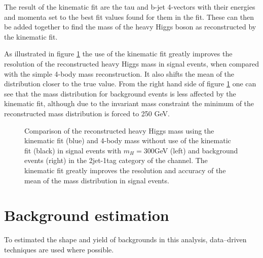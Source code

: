 The result of the kinematic fit are the tau and b-jet 4-vectors with their energies and momenta
set to the best fit values found for them in the fit. These can then be added together to find
the mass of the heavy Higgs boson as reconstructed by the kinematic fit.

As illustrated in figure \ref{fig:kinfitvsmjj} the use of the kinematic fit greatly
improves the resolution of the reconstructed heavy Higgs mass in signal events, when 
compared with the simple 4-body mass reconstruction. It also shifts the mean of the
distribution closer to the true value. From the right hand side of
figure \ref{fig:kinfitvsmjj} one can see that the mass distribution for
background events is less affected by the kinematic fit, although due to the
invariant mass constraint the minimum of the reconstructed mass distribution
is forced to 250 GeV.

\begin{figure}[h!]
\begin{center}
\end{center}
\caption{Comparison of the reconstructed heavy Higgs mass using the kinematic fit (blue) and
4-body mass without use of the kinematic fit (black) in signal events with $m_{H} = 300 $GeV (left) and \ttbar background events (right) in 
the 2jet-1tag category of the \mutau channel. The kinematic fit greatly improves the resolution and 
accuracy of the mean of the mass distribution in signal events. \cite{HIG-14-034-additional}}%
\label{fig:kinfitvsmjj}
\end{figure}


\section{Background estimation}
\label{sec:hhh_backgrounds}
To estimated the shape and yield of backgrounds in this analysis, data--driven techniques are
used where possible. 

